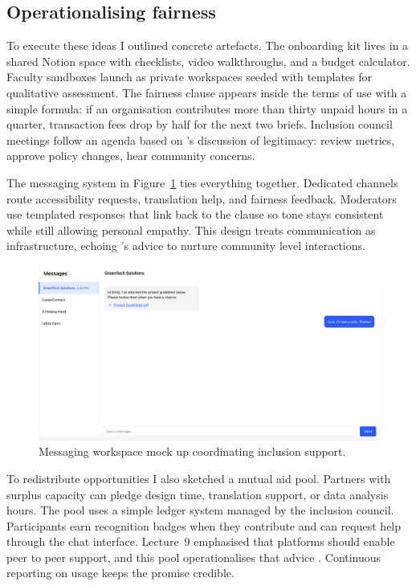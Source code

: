 \subsection*{Operationalising fairness}
To execute these ideas I outlined concrete artefacts. The onboarding kit lives in a shared Notion space with checklists, video walkthroughs, and a budget calculator. Faculty sandboxes launch as private workspaces seeded with templates for qualitative assessment. The fairness clause appears inside the terms of use with a simple formula: if an organisation contributes more than thirty unpaid hours in a quarter, transaction fees drop by half for the next two briefs. Inclusion council meetings follow an agenda based on \citet{Lecture11}'s discussion of legitimacy: review metrics, approve policy changes, hear community concerns.

The messaging system in Figure~\ref{fig:chat-system} ties everything together. Dedicated channels route accessibility requests, translation help, and fairness feedback. Moderators use templated responses that link back to the clause so tone stays consistent while still allowing personal empathy. This design treats communication as infrastructure, echoing \citet{Choudary2016}'s advice to nurture community level interactions.

\begin{figure}[H]
  \centering
  \includegraphics[width=0.85\linewidth]{figures/Messengersystem.png}
  \caption{Messaging workspace mock up coordinating inclusion support.}
  \label{fig:chat-system}
\end{figure}

To redistribute opportunities I also sketched a mutual aid pool. Partners with surplus capacity can pledge design time, translation support, or data analysis hours. The pool uses a simple ledger system managed by the inclusion council. Participants earn recognition badges when they contribute and can request help through the chat interface. Lecture~9 emphasised that platforms should enable peer to peer support, and this pool operationalises that advice \citep{Lecture09}. Continuous reporting on usage keeps the promise credible.
